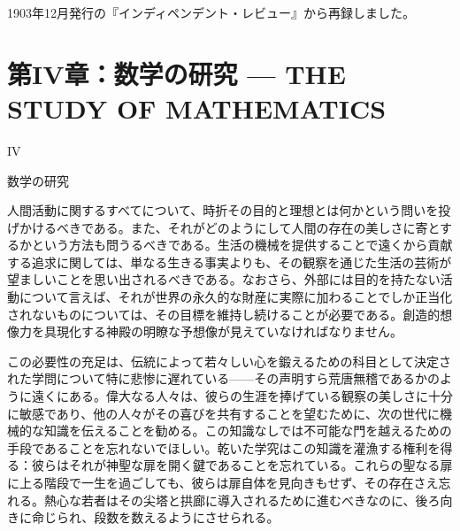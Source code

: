 \documentclass[a4paper,11pt,openany]{ltjsbook}
\begin{document}
 1903年12月発行の『インディペンデント・レビュー』から再録しました。


\chapter{第IV章：数学の研究 --- {THE STUDY OF MATHEMATICS}}

IV

数学の研究


人間活動に関するすべてについて、時折その目的と理想とは何かという問いを投げかけるべきである。また、それがどのようにして人間の存在の美しさに寄とするかという方法も問うるべきである。生活の機械を提供することで遠くから貢献する追求に関しては、単なる生きる事実よりも、その観察を通じた生活の芸術が望ましいことを思い出されるべきである。なおさら、外部には目的を持たない活動について言えば、それが世界の永久的な財産に実際に加わることでしか正当化されないものについては、その目標を維持し続けることが必要である。創造的想像力を具現化する神殿の明瞭な予想像が見えていなければなりません。

この必要性の充足は、伝統によって若々しい心を鍛えるための科目として決定された学問について特に悲惨に遅れている——その声明すら荒唐無稽であるかのように遠くにある。偉大なる人々は、彼らの生涯を捧げている観察の美しさに十分に敏感であり、他の人々がその喜びを共有することを望むために、次の世代に機械的な知識を伝えることを勧める。この知識なしでは不可能な門を越えるための手段であることを忘れないでほしい。乾いた学究はこの知識を灌漁する権利を得る：彼らはそれが神聖な扉を開く鍵であることを忘れている。これらの聖なる扉に上る階段で一生を過ごしても、彼らは扉自体を見向きもせず、その存在さえ忘れる。熱心な若者はその尖塔と拱廊に導入されるために進むべきなのに、後ろ向きに命じられ、段数を数えるようにさせられる。
\end{document}
